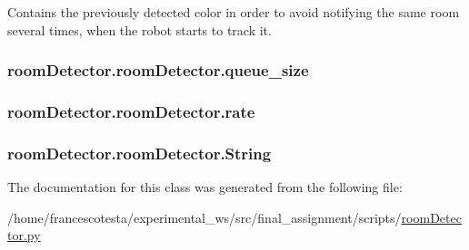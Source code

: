 Contains the previously detected color in order to avoid notifying the same room several times, when the robot starts to track it. 

\subsubsection[{\texorpdfstring{queue\+\_\+size}{queue_size}}]{\setlength{\rightskip}{0pt plus 5cm}room\+Detector.\+room\+Detector.\+queue\+\_\+size\hspace{0.3cm}{\ttfamily [static]}}\hypertarget{classroomDetector_1_1roomDetector_a86aaaea08936260cb6e591c10b0dfeae}{}\label{classroomDetector_1_1roomDetector_a86aaaea08936260cb6e591c10b0dfeae}
\subsubsection[{\texorpdfstring{rate}{rate}}]{\setlength{\rightskip}{0pt plus 5cm}room\+Detector.\+room\+Detector.\+rate\hspace{0.3cm}{\ttfamily [static]}}\hypertarget{classroomDetector_1_1roomDetector_ad3dbc1e4c7a827af098c86101198a1f4}{}\label{classroomDetector_1_1roomDetector_ad3dbc1e4c7a827af098c86101198a1f4}
\subsubsection[{\texorpdfstring{String}{String}}]{\setlength{\rightskip}{0pt plus 5cm}room\+Detector.\+room\+Detector.\+String\hspace{0.3cm}{\ttfamily [static]}}\hypertarget{classroomDetector_1_1roomDetector_a14b6749ddaf264a41497904c0513ed9b}{}\label{classroomDetector_1_1roomDetector_a14b6749ddaf264a41497904c0513ed9b}


The documentation for this class was generated from the following file\+:\begin{DoxyCompactItemize}
\item 
/home/francescotesta/experimental\+\_\+ws/src/final\+\_\+assignment/scripts/\hyperlink{roomDetector_8py}{room\+Detector.\+py}\end{DoxyCompactItemize}
